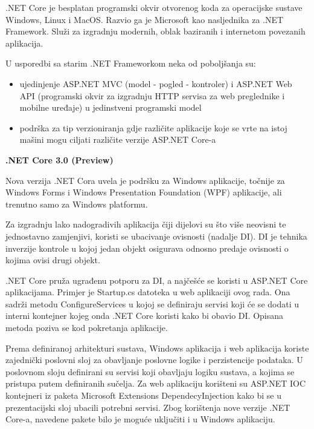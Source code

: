 \documentclass[times, utf8, diplomski]{fer}
\begin{document}
.NET Core je besplatan programski okvir otvorenog koda  za operacijske sustave Windows, Linux i MacOS. Razvio ga je Microsoft kao nasljednika za .NET Framework. Služi za izgradnju modernih, oblak baziranih  i internetom povezanih aplikacija. \citep{dotnet}

U usporedbi sa starim .NET Frameworkom neka od poboljšanja su:
\begin{itemize}
    \item ujedinjenje ASP.NET MVC (model - pogled - kontroler) i ASP.NET Web API (programski okvir za izgradnju HTTP servisa za web preglednike i mobilne uređaje) u jedinstveni programski model
    \item podrška za tip verzioniranja gdje različite aplikacije koje se vrte na istoj mašini mogu ciljati različite verzije ASP.NET Core-a
\end{itemize}{}


\hfill\break
\textbf{.NET Core 3.0 (Preview)}

Nova verzija .NET Cora uvela je podršku za Windows aplikacije, točnije za Windows Forms i Windows Presentation Foundation (WPF) aplikacije, ali trenutno samo za Windows platformu.

Za izgradnju lako nadogradivih aplikacija čiji dijelovi su što više neovisni te jednostavno zamjenjivi, koristi se ubacivanje ovisnosti  (nadalje DI). DI je tehnika inverzije  kontrole u kojoj jedan objekt osigurava odnosno predaje ovisnosti o kojima ovisi drugi objekt. 

.NET Core pruža ugrađenu potporu za DI, a najčešće se koristi u ASP.NET Core aplikacijama. Primjer je Startup.cs datoteka u web aplikaciji ovog rada. Ona sadrži metodu ConfigureServices u kojoj se definiraju servisi koji će se dodati u interni kontejner kojeg onda .NET Core koristi kako bi obavio DI. Opisana metoda poziva se kod pokretanja aplikacije.

Prema definiranoj arhitekturi sustava, Windows aplikacija i web aplikacija koriste zajednički poslovni sloj za obavljanje poslovne logike i perzistencije podataka. U poslovnom sloju definirani su servisi koji obavljaju logiku sustava, a kojima se pristupa putem definiranih sučelja. Za web aplikaciju korišteni su ASP.NET IOC kontejneri iz paketa Microsoft Extensions DependecyInjection kako bi se u prezentacijski sloj ubacili potrebni servisi. 
Zbog korištenja nove verzije .NET Core-a, navedene pakete bilo je moguće uključiti i u Windows aplikaciju. 
\end{document}
